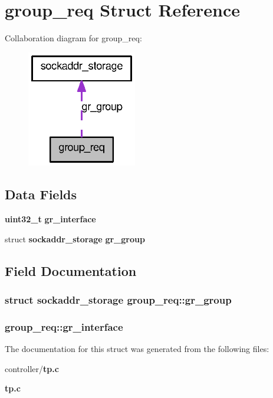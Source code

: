 \section{group\_\-req Struct Reference}
\label{structgroup__req}


Collaboration diagram for group\_\-req:
\nopagebreak
\begin{figure}[H]
\begin{center}
\leavevmode
\includegraphics[width=136pt]{structgroup__req__coll__graph}
\end{center}
\end{figure}
\subsection*{Data Fields}
\begin{DoxyCompactItemize}
\item 
{\bf uint32\_\-t} {\bf gr\_\-interface}
\item 
struct {\bf sockaddr\_\-storage} {\bf gr\_\-group}
\end{DoxyCompactItemize}


\subsection{Field Documentation}
\subsubsection[{gr\_\-group}]{\setlength{\rightskip}{0pt plus 5cm}struct {\bf sockaddr\_\-storage} {\bf group\_\-req::gr\_\-group}}\label{structgroup__req_ac908300a839f5ee936c0f3e656ad27e2}
\subsubsection[{gr\_\-interface}]{ {\bf group\_\-req::gr\_\-interface}}\label{structgroup__req_a40ecf4278b613556b74a413672168944}


The documentation for this struct was generated from the following files:\begin{DoxyCompactItemize}
\item 
controller/{\bf tp.c}\item 
{\bf tp.c}\end{DoxyCompactItemize}
